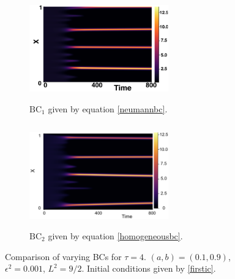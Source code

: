 \begin{figure}[H]
    \centering
    \begin{subfigure}[t]{0.45\textwidth}
        \centering
        \includegraphics[width=6cm,height=4.5cm]{ic24.png}
        \caption{$\text{BC}_1$ given by equation \eqref{neumannbc}.}
        \label{}
    \end{subfigure}
    \hfill
    \begin{subfigure}[t]{0.45\textwidth}
        \centering
        \includegraphics[width=6cm,height=4.5cm]{bc4.png}
        \caption{$\text{BC}_2$ given by equation \eqref{homogeneousbc}.}
        \label{}
    \end{subfigure}
    \caption{Comparison of varying BCs for $\tau=4$. $(a,b)=(0.1,0.9)$, $\epsilon^2=0.001$, $L^2=9/2$. Initial conditions given by \eqref{firstic}.}
    \label{fig:Bbc4}
\end{figure}

